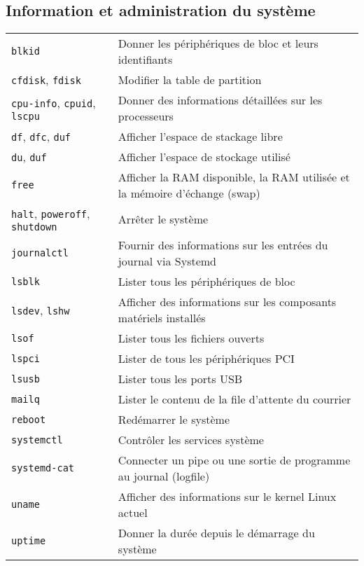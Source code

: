 \documentclass[10pt,a4paper]{article}
\begin{document}
\cheatsheet

\begin{multicols}{2}

\section{Information et administration du système}
\begin{tabular}{ p{2.5cm} p{8.5cm} }
  \hline
  \texttt{blkid} & Donner les périphériques de bloc et leurs identifiants\\
  \rowcolor{Gray}
  \texttt{cfdisk}, \texttt{fdisk} & Modifier la table de partition \\
  \texttt{cpu-info}, \texttt{cpuid}, \texttt{lscpu} & Donner des informations détaillées sur les processeurs \\
  \rowcolor{Gray}
  \texttt{df}, \texttt{dfc}, \texttt{duf} & Afficher l'espace de stackage libre \\
  \texttt{du}, \texttt{duf} & Afficher l'espace de stockage utilisé \\
  \rowcolor{Gray}
  \texttt{free} & Afficher la RAM disponible, la RAM utilisée et la mémoire d'échange (swap)\\
  \texttt{halt}, \texttt{poweroff}, \texttt{shutdown} & Arrêter le système\\
  \rowcolor{Gray}
  \texttt{journalctl} & Fournir des informations sur les entrées du journal via Systemd \\
  \texttt{lsblk} & Lister tous les périphériques de bloc\\
  \rowcolor{Gray}
  \texttt{lsdev}, \texttt{lshw} & Afficher des informations sur les composants matériels installés\\
  \texttt{lsof} & Lister tous les fichiers ouverts\\
  \rowcolor{Gray}
  \texttt{lspci} & Lister de tous les périphériques PCI\\
  \texttt{lsusb} & Lister tous les ports USB\\
  \rowcolor{Gray}
  \texttt{mailq} & Lister le contenu de la file d'attente du courrier\\
  \texttt{reboot} & Redémarrer le système\\
  \rowcolor{Gray}
  \texttt{systemctl} & Contrôler les services système \\
  \texttt{systemd-cat} & Connecter un pipe ou une sortie de programme au journal (logfile)\\
  \rowcolor{Gray}
  \texttt{uname} & Afficher des informations sur le kernel Linux actuel\\
  \texttt{uptime} & Donner la durée depuis le démarrage du système\\
  \hline
\end{tabular}


\end{multicols}
\end{document}
